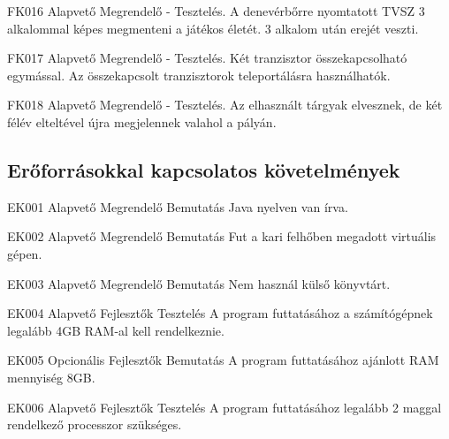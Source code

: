 \begin{funkovetelmeny}
	{FK016}
	{Alapvető}
	{Megrendelő}
	{-}
	{Tesztelés.}
	{A denevérbőrre nyomtatott TVSZ 3 alkalommal képes megmenteni a játékos életét. 3 alkalom után erejét veszti.}
\end{funkovetelmeny}
\begin{funkovetelmeny}
	{FK017}
	{Alapvető}
	{Megrendelő}
	{-}
	{Tesztelés.}
	{Két tranzisztor összekapcsolható egymással. Az összekapcsolt tranzisztorok teleportálásra használhatók.}
\end{funkovetelmeny}
\begin{funkovetelmeny}
	{FK018}
	{Alapvető}
	{Megrendelő}
	{-}
	{Tesztelés.}
	{Az elhasznált tárgyak elvesznek, de két félév elteltével újra megjelennek valahol a pályán.}
\end{funkovetelmeny}
\clearpage

\subsection{Erőforrásokkal kapcsolatos követelmények}
\begin{kovetelmeny}
	{EK001} %
	{Alapvető} %
	{Megrendelő} %
	{Bemutatás} %
	{Java nyelven van írva.} %
\end{kovetelmeny}
\begin{kovetelmeny}
	{EK002} %
	{Alapvető} %
	{Megrendelő} %
	{Bemutatás} %
	{Fut a kari felhőben megadott virtuális gépen.} %
\end{kovetelmeny}
\begin{kovetelmeny}
	{EK003} %
	{Alapvető} %
	{Megrendelő} %
	{Bemutatás} %
	{Nem használ külső könyvtárt.} %
\end{kovetelmeny}
\begin{kovetelmeny}
	{EK004} %
	{Alapvető} %
	{Fejlesztők} %
	{Tesztelés} %
	{A program futtatásához a számítógépnek legalább 4GB RAM-al kell rendelkeznie.} %
\end{kovetelmeny}
\begin{kovetelmeny}
	{EK005} %
	{Opcionális} %
	{Fejlesztők} %
	{Bemutatás} %
	{A program futtatásához ajánlott RAM mennyiség 8GB.} %
\end{kovetelmeny}
\begin{kovetelmeny}
	{EK006} %
	{Alapvető} %
	{Fejlesztők} %
	{Tesztelés} %
	{A program futtatásához legalább 2 maggal rendelkező processzor szükséges.} %
\end{kovetelmeny}
